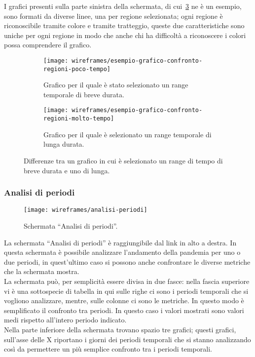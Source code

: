 I grafici presenti sulla parte sinistra della schermata, di cui~\ref{fig:esempio-grafico-confronto-regioni} ne è un esempio, sono formati da diverse linee, una per regione selezionata; ogni regione è riconoscibile tramite colore e tramite tratteggio, queste due caratteristiche sono uniche per ogni regione in modo che anche chi ha difficoltà a riconoscere i colori possa comprendere il grafico.

\begin{figure}[H]
    \begin{subfigure}[b]{0.5\textwidth}
        \centering
        \texttt{[image: wireframes/esempio-grafico-confronto-regioni-poco-tempo]}
        \caption{Grafico per il quale è stato selezionato un range temporale di breve durata.}\label{fig:esempio-grafico-confronto-regioni-poco-tempo}
    \end{subfigure}
\hfill
    \begin{subfigure}[b]{0.5\textwidth}
        \centering
        \texttt{[image: wireframes/esempio-grafico-confronto-regioni-molto-tempo]}
        \caption{Grafico per il quale è selezionato un range temporale di lunga durata.}\label{fig:esempio-grafico-confronto-regioni-molto-tempo}
    \end{subfigure}
    \caption{Differenze tra un grafico in cui è selezionato un range di tempo di breve durata e uno di lunga.}\label{fig:esempio-grafico-confronto-regioni}
\end{figure}

\subsubsection{Analisi di periodi}\label{ss:analisi-di-periodi}
\begin{figure}[H]
    \centering
    \texttt{[image: wireframes/analisi-periodi]}
    \caption{Schermata ``Analisi di periodi''.}\label{fig:analisi-periodi}
\end{figure}
La schermata ``Analisi di periodi'' è raggiungibile dal link in alto a destra. In questa schermata è possibile analizzare l'andamento della pandemia per uno o due periodi, in quest'ultimo caso si possono anche confrontare le diverse metriche che la schermata mostra.\\
La schermata può, per semplicità essere divisa in due fasce: nella fascia superiore vi è una sottospecie di tabella in qui sulle righe ci sono i periodi temporali che si vogliono analizzare, mentre, sulle colonne ci sono le metriche. In questo modo è semplificato il confronto tra periodi. In questo caso i valori mostrati sono valori medi rispetto all'intero periodo indicato.\\
Nella parte inferiore della schermata trovano spazio tre grafici; questi grafici, sull'asse delle X riportano i giorni dei periodi temporali che si stanno analizzando così da permettere un più semplice confronto tra i periodi temporali.


